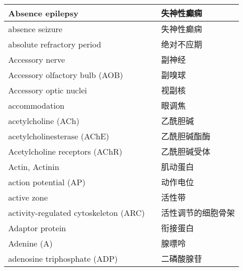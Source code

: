 \begin{longtable}{lll}
 	\midrule
 	Absence epilepsy     && 失神性癫痫   \\
 	
 	\midrule
 	absence seizure     && 失神性癫痫   \\
 	
 	\midrule
 	absolute refractory period     && 绝对不应期   \\
 	
 	\midrule
 	Accessory nerve   &&  副神经   \\
 	
 	\midrule
 	Accessory olfactory bulb  (AOB) &&  副嗅球   \\
 	
 	\midrule
 	Accessory optic nuclei   && 视副核   \\
 	
 	\midrule
 	accommodation   && 眼调焦   \\
 
	\midrule
	acetylcholine (ACh)     && 乙酰胆碱   \\
	
	\midrule
	acetylcholinesterase (AChE)     && 乙酰胆碱酯酶   \\
	
	\midrule
	Acetylcholine receptors (AChR)    && 乙酰胆碱受体   \\
	
	\midrule
	Actin, Actinin  && 肌动蛋白	   \\
	
	\midrule
	action potential  (AP)  && 动作电位   \\
	
	\midrule
	active zone  && 活性带   \\
	
	\midrule
	activity-regulated cytoskeleton (ARC) && 活性调节的细胞骨架   \\
	
	\midrule
	Adaptor protein     && 衔接蛋白   \\
	
	\midrule
	Adenine (A)     && 腺嘌呤   \\
	
	\midrule
	adenosine triphosphate (ADP)     && 二磷酸腺苷   \\
	

\end{longtable}
